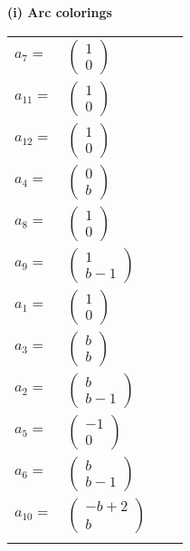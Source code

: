 \documentclass[1p]{elsarticle_modified}
\theoremstyle{definition}
\begin{document}
\flushleft \textbf{(i) Arc colorings}\\
\begin{tabular}{m{7pt} m{180pt} m{7pt} m{180pt} }
\flushright $a_{7}=$&$\begin{pmatrix}1\\0\end{pmatrix}$ \\
\flushright $a_{11}=$&$\begin{pmatrix}1\\0\end{pmatrix}$ \\
\flushright $a_{12}=$&$\begin{pmatrix}1\\0\end{pmatrix}$ \\
\flushright $a_{4}=$&$\begin{pmatrix}0\\b\end{pmatrix}$ \\
\flushright $a_{8}=$&$\begin{pmatrix}1\\0\end{pmatrix}$ \\
\flushright $a_{9}=$&$\begin{pmatrix}1\\b-1\end{pmatrix}$ \\
\flushright $a_{1}=$&$\begin{pmatrix}1\\0\end{pmatrix}$ \\
\flushright $a_{3}=$&$\begin{pmatrix}b\\b\end{pmatrix}$ \\
\flushright $a_{2}=$&$\begin{pmatrix}b\\b-1\end{pmatrix}$ \\
\flushright $a_{5}=$&$\begin{pmatrix}-1\\0\end{pmatrix}$ \\
\flushright $a_{6}=$&$\begin{pmatrix}b\\b-1\end{pmatrix}$ \\
\flushright $a_{10}=$&$\begin{pmatrix}- b+2\\b\end{pmatrix}$\\&\end{tabular}
\end{document}
